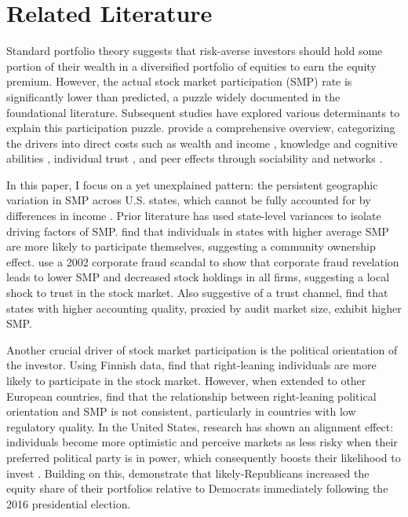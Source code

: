 
\section{Related Literature}
\label{sec:litreview}

Standard portfolio theory suggests that risk-averse investors should hold some portion of their wealth in a diversified portfolio of equities to earn the equity premium. However, the actual stock market participation (SMP) rate is significantly lower than predicted, a puzzle widely documented in the foundational literature. Subsequent studies have explored various determinants to explain this participation puzzle. \citet{menkhoff2025} provide a comprehensive overview, categorizing the drivers into direct costs such as wealth and income \citep{guiso2008}, knowledge and cognitive abilities \citep{vanrooij2011}, individual trust \citep{guiso2008, bu2022}, and peer effects through sociability and networks \citep{hong2004, brown2008}. 

In this paper, I focus on a yet unexplained pattern: the persistent geographic variation in SMP across U.S. states, which cannot be fully accounted for by differences in income \citep{chien2017}. Prior literature has used state-level variances to isolate driving factors of SMP. \citet{brown2004} find that individuals in states with higher average SMP are more likely to participate themselves, suggesting a community ownership effect. \citet{giannetti2016} use a 2002 corporate fraud scandal to show that corporate fraud revelation leads to lower SMP and decreased stock holdings in all firms, suggesting a local shock to trust in the stock market. Also suggestive of a trust channel, \citet{huang2023} find that states with higher accounting quality, proxied by audit market size, exhibit higher SMP.  

Another crucial driver of stock market participation is the political orientation of the investor. Using Finnish data, \citet{kaustia2011} find that right-leaning individuals are more likely to participate in the stock market. However, when extended to other European countries, \citet{kaustia2023} find that the relationship between right-leaning political orientation and SMP is not consistent, particularly in countries with low regulatory quality. In the United States, research has shown an alignment effect: individuals become more optimistic and perceive markets as less risky when their preferred political party is in power, which consequently boosts their likelihood to invest \citep{bonaparte2017}. Building on this, \citet{meeuwis2022} demonstrate that likely-Republicans increased the equity share of their portfolios relative to Democrats immediately following the 2016 presidential election.  

